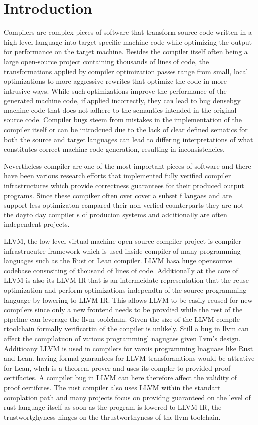 \newcommand{\package}{\emph}

\chapter{Introduction}
Compilers are complex pieces of software that transform source code written in a high-level language into target-specific machine code while optimizing the output for performance on the target machine. Besides the compiler itself often being a large open-source project containing thousands of lines of code, the transformations applied by compiler optimization passes range from small, local optimizations to more aggressive rewrites that optimize the code in more intrusive ways.
While such optimizations improve the performance of the generated machine code, if applied incorrectly, they can lead to bug densebgy machine code that does not adhere to the semantics intended in the original source code. Compiler bugs steem from mistakes in the implementation of the compiler itself or can be introdcued due to the lack of clear defined sematics for both the source and target languages can lead to differing interpretations of what constitutes correct machine code generation, resulting in inconsistencies.

Nevertheless compiler are one of the most important pieces of software and there have been various research efforts that implemented fully verified compiler infrastructures which provide correctness guarantees for their produced output programs. Since these compiker often over cover a subset f langaes and are support less optimizaton compared their non-verfied counterparts they are not the dayto day compiler s of producion systems and additionally are often independent projects.

LLVM, the low-level virtual machine open source compiler project is compiler infrastrucutre framework which is used inside compiler of many programming languages such as the Rust or Lean compiler. LLVM hasa huge opensource codebase consnsiting of thousand of lines of code. Additionally at the core of  LLVM is also its LLVM IR  that is an intermeidate representation that the reuse optimization and perform optimizations independtn of the source programming language by lowering to LLVM IR. This allows LLVM to be easily reused for new compilers since only a new frontend needs to be provdied while the rest of the pipeline can leverage the llvm toolchain.
Given the size of the LLVM compile rtoolchain formally verificartin of the conpiler is unlikely. Still a bug in llvm can affect the compilatuon of various programmingl nagugaes given llvm's design. Additioany LLVM is used in compilers for varois programming lnaguaes like Rust and Lean. having formal guarantees for LLVM transforamtions would be attrative for Lean, whch is a theorem prover and uses its compler to provided proof certifactes. A compiler bug in LLVM can here therefore affect the validity of proof certifctes.   The rust compiler also uses LLVM within the standart complation path and many projects focus on providng guaranteed  on the level of rust language itself as soon as the program is lowered to LLVM IR, the trustwortghyness hinges on the thrustworthyness of the llvm toolchain. 

